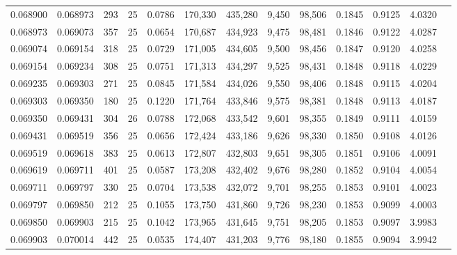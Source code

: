 \begin{tabular}{rrrrrrrrrrrrr}
0.068900 & 0.068973 &   293 &  25 &                                     0.0786 & 170,330 & 435,280 &   9,450 &  98,506 & 0.1845 & 0.9125 & 4.0320 \\
0.068973 & 0.069073 &   357 &  25 &                                     0.0654 & 170,687 & 434,923 &   9,475 &  98,481 & 0.1846 & 0.9122 & 4.0287 \\
0.069074 & 0.069154 &   318 &  25 &                                     0.0729 & 171,005 & 434,605 &   9,500 &  98,456 & 0.1847 & 0.9120 & 4.0258 \\
0.069154 & 0.069234 &   308 &  25 &                                     0.0751 & 171,313 & 434,297 &   9,525 &  98,431 & 0.1848 & 0.9118 & 4.0229 \\
0.069235 & 0.069303 &   271 &  25 &                                     0.0845 & 171,584 & 434,026 &   9,550 &  98,406 & 0.1848 & 0.9115 & 4.0204 \\
0.069303 & 0.069350 &   180 &  25 &                                     0.1220 & 171,764 & 433,846 &   9,575 &  98,381 & 0.1848 & 0.9113 & 4.0187 \\
0.069350 & 0.069431 &   304 &  26 &                                     0.0788 & 172,068 & 433,542 &   9,601 &  98,355 & 0.1849 & 0.9111 & 4.0159 \\
0.069431 & 0.069519 &   356 &  25 &                                     0.0656 & 172,424 & 433,186 &   9,626 &  98,330 & 0.1850 & 0.9108 & 4.0126 \\
0.069519 & 0.069618 &   383 &  25 &                                     0.0613 & 172,807 & 432,803 &   9,651 &  98,305 & 0.1851 & 0.9106 & 4.0091 \\
0.069619 & 0.069711 &   401 &  25 &                                     0.0587 & 173,208 & 432,402 &   9,676 &  98,280 & 0.1852 & 0.9104 & 4.0054 \\
0.069711 & 0.069797 &   330 &  25 &                                     0.0704 & 173,538 & 432,072 &   9,701 &  98,255 & 0.1853 & 0.9101 & 4.0023 \\
0.069797 & 0.069850 &   212 &  25 &                                     0.1055 & 173,750 & 431,860 &   9,726 &  98,230 & 0.1853 & 0.9099 & 4.0003 \\
0.069850 & 0.069903 &   215 &  25 &                                     0.1042 & 173,965 & 431,645 &   9,751 &  98,205 & 0.1853 & 0.9097 & 3.9983 \\
0.069903 & 0.070014 &   442 &  25 &                                     0.0535 & 174,407 & 431,203 &   9,776 &  98,180 & 0.1855 & 0.9094 & 3.9942 \\

\end{tabular}
